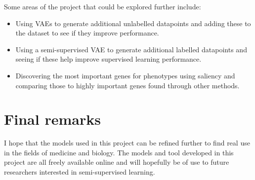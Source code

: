 Some areas of the project that could be explored further include:
\begin{itemize}
    \item Using VAEs to generate additional unlabelled datapoints and adding these to the dataset to see if they improve performance.
    \item Using a semi-supervised VAE to generate additional labelled datapoints and seeing if these help improve supervised learning 
          performance.
    \item Discovering the most important genes for phenotypes using saliency and comparing those to highly important genes found through
          other methods.  
\end{itemize}

\section{Final remarks}

I hope that the models used in this project can be refined further to find real use in the fields of medicine and biology. The models and tool
developed in this project are all freely available online and will hopefully be of use to future researchers interested in semi-supervised
learning.